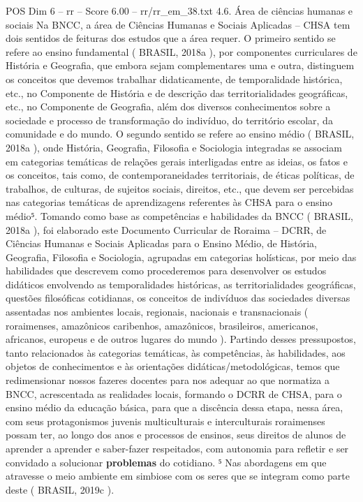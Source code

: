\begin{textsample}{POS Dim 6 – rr – Score 6.00 – rr/rr\_em\_38.txt}  \label{ex:f6_pos_220}
4.6.
Área de ciências humanas e sociais Na BNCC, a área de Ciências Humanas e Sociais Aplicadas – CHSA tem dois sentidos de feituras dos estudos que a área requer.
O primeiro sentido se refere ao ensino fundamental ( BRASIL, 2018a ), por componentes curriculares de História e Geografia, que embora sejam complementares uma e outra, distinguem os conceitos que devemos trabalhar didaticamente, de temporalidade histórica, etc., no Componente de História e de descrição das territorialidades geográficas, etc., no Componente de Geografia, além dos diversos conhecimentos sobre a sociedade e processo de transformação do indivíduo, do território escolar, da comunidade e do mundo.
O segundo sentido se refere ao ensino médio ( BRASIL, 2018a ), onde História, Geografia, Filosofia e Sociologia integradas se associam em categorias temáticas de relações gerais interligadas entre as ideias, os fatos e os conceitos, tais como, de contemporaneidades territoriais, de éticas políticas, de trabalhos, de culturas, de sujeitos sociais, direitos, etc., que devem ser percebidas nas categorias temáticas de aprendizagens referentes às CHSA para o ensino médio⁵.
Tomando como base as competências e habilidades da BNCC ( BRASIL, 2018a ), foi elaborado este Documento Curricular de Roraima – DCRR, de Ciências Humanas e Sociais Aplicadas para o Ensino Médio, de História, Geografia, Filosofia e Sociologia, agrupadas em categorias holísticas, por meio das habilidades que descrevem como procederemos para desenvolver os estudos didáticos envolvendo as temporalidades históricas, as territorialidades geográficas, questões filosóficas cotidianas, os conceitos de indivíduos das sociedades diversas assentadas nos ambientes locais, regionais, nacionais e transnacionais ( roraimenses, amazônicos caribenhos, amazônicos, brasileiros, americanos, africanos, europeus e de outros lugares do mundo ).
Partindo desses pressupostos, tanto relacionados às categorias temáticas, às competências, às habilidades, aos objetos de conhecimentos e às orientações didáticas/metodológicas, temos que redimensionar nossos fazeres docentes para nos adequar ao que normatiza a BNCC, acrescentada as realidades locais, formando o DCRR de CHSA, para o ensino médio da educação básica, para que a discência dessa etapa, nessa área, com seus protagonismos juvenis multiculturais e interculturais roraimenses possam ter, ao longo dos anos e processos de ensinos, seus direitos de alunos de aprender a aprender e saber-fazer respeitados, com autonomia para refletir e ser convidado a solucionar \textbf{problemas} do cotidiano. ⁵ Nas abordagens em que atravesse o meio ambiente em simbiose com os seres que se integram como parte deste ( BRASIL, 2019c ).

\end{textsample}
